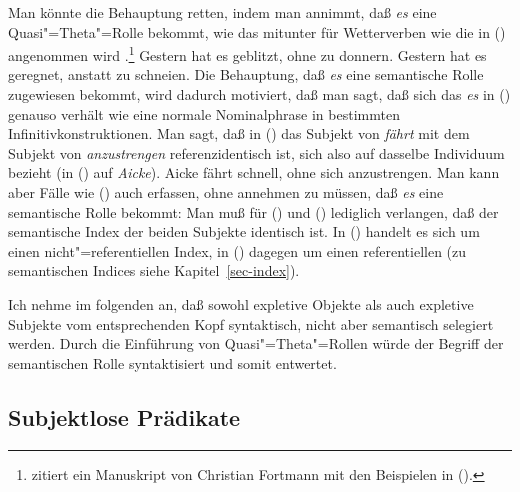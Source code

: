 \noindent
Man könnte die Behauptung retten, indem man annimmt, daß \emph{es} eine
Quasi"=Theta"=Rolle bekommt, wie das mitunter für
Wetterverben wie die in () angenommen wird
  \citep[--327]{Chomsky93a}\nocite{Chomsky81a}.\footnote{ 
  \citet{Berman99a} zitiert ein Manuskript von Christian Fortmann 
  mit den Beispielen in ().%
}
\eal
\ex Gestern hat es geblitzt, ohne zu donnern.
\ex Gestern hat es geregnet, anstatt zu schneien.
\zl
Die Behauptung, daß \emph{es} eine semantische Rolle zugewiesen bekommt, wird dadurch
motiviert, daß man sagt, daß sich das \emph{es} in () genauso verhält wie eine
normale Nominalphrase in bestimmten Infinitivkonstruktionen.
Man sagt, daß in () das Subjekt von \emph{fährt} mit dem Subjekt von \emph{anzustrengen}
referenzidentisch ist, sich also auf dasselbe Individuum bezieht (in () auf \emph{Aicke}).
\ea
Aicke fährt schnell, ohne sich anzustrengen.
\z
Man kann aber Fälle wie () auch erfassen, ohne annehmen
zu müssen, daß \emph{es} eine semantische Rolle bekommt: Man muß für () und ()
lediglich verlangen, daß der semantische Index der beiden
Subjekte identisch ist. In () handelt es sich um einen
nicht"=referentiellen Index, in () dagegen um einen referentiellen 
(zu semantischen Indices siehe Kapitel~\ref{sec-index}).

Ich nehme im folgenden an, daß sowohl expletive Objekte als auch expletive Subjekte
vom entsprechenden Kopf syntaktisch, nicht aber semantisch selegiert werden.
Durch die Einführung von Quasi"=Theta"=Rollen würde der Begriff der semantischen Rolle 
syntaktisiert\label{page-syntaktisierung} und somit entwertet.

\subsection{Subjektlose Prädikate}
\label{sec-subjekt-valenz}

